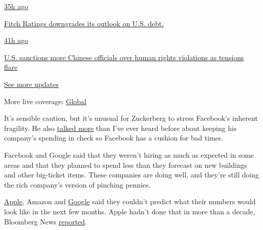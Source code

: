 \href{https://www.nytimes3xbfgragh.onion/live/2020/07/31/business/stock-market-today-coronavirus?action=click\&pgtype=Article\&state=default\&region=MAIN_CONTENT_1\&context=storylines_live_updates\#fitch-ratings-downgrades-its-outlook-on-us-debt}{35h
ago}

\href{https://www.nytimes3xbfgragh.onion/live/2020/07/31/business/stock-market-today-coronavirus?action=click\&pgtype=Article\&state=default\&region=MAIN_CONTENT_1\&context=storylines_live_updates\#fitch-ratings-downgrades-its-outlook-on-us-debt}{Fitch
Ratings downgrades its outlook on U.S. debt.}

\href{https://www.nytimes3xbfgragh.onion/live/2020/07/31/business/stock-market-today-coronavirus?action=click\&pgtype=Article\&state=default\&region=MAIN_CONTENT_1\&context=storylines_live_updates\#us-sanctions-more-chinese-officials-over-human-rights-violations-as-tensions-flare}{41h
ago}

\href{https://www.nytimes3xbfgragh.onion/live/2020/07/31/business/stock-market-today-coronavirus?action=click\&pgtype=Article\&state=default\&region=MAIN_CONTENT_1\&context=storylines_live_updates\#us-sanctions-more-chinese-officials-over-human-rights-violations-as-tensions-flare}{U.S.
sanctions more Chinese officials over human rights violations as
tensions flare}

\href{https://www.nytimes3xbfgragh.onion/live/2020/07/31/business/stock-market-today-coronavirus?action=click\&pgtype=Article\&state=default\&region=MAIN_CONTENT_1\&context=storylines_live_updates}{See
more updates}

More live coverage:
\href{https://www.nytimes3xbfgragh.onion/2020/08/01/world/coronavirus-covid-19.html?action=click\&pgtype=Article\&state=default\&region=MAIN_CONTENT_1\&context=storylines_live_updates}{Global}

It's sensible caution, but it's unusual for Zuckerberg to stress
Facebook's inherent fragility. He also
\href{https://www.nytimes3xbfgragh.onion/2020/04/29/technology/facebook-earnings-advertising-virus.html}{talked
more} than I've ever heard before about keeping his company's spending
in check so Facebook has a cushion for bad times.

Facebook and Google said that they weren't hiring as much as expected in
some areas and that they planned to spend less than they forecast on new
buildings and other big-ticket items. These companies are doing well,
and they're still doing the rich company's version of pinching pennies.

\href{https://www.nytimes3xbfgragh.onion/2020/04/30/technology/apple-sales-earnings-coronavirus.html}{Apple},
Amazon and
\href{https://www.nytimes3xbfgragh.onion/2020/04/28/technology/alphabet-google-earnings-coronavirus.html}{Google}
said they couldn't predict what their numbers would look like in the
next few months. Apple hadn't done that in more than a decade, Bloomberg
News
\href{https://www.bloomberg.com/news/articles/2020-04-30/apple-squeezes-growth-out-of-pandemic-ravaged-quarter}{reported}.

